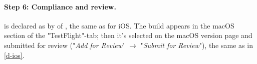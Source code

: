 \paragraph{Step 6: Compliance and review.}  is declared as  by
 of , the same as for iOS. The build appears in the macOS section of the
"TestFlight"-tab; then it's selected on the macOS version page and submitted for review ("\emph{Add for Review}"
$\rightarrow$ "\emph{Submit for Review}"), the same as in \ref{d-ios}.

